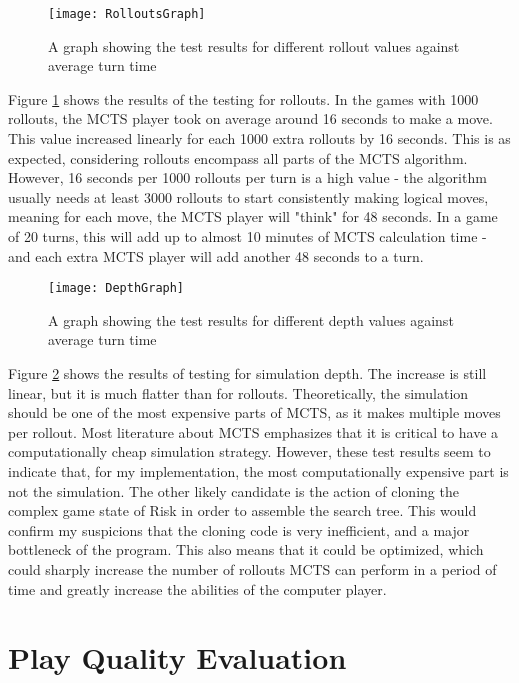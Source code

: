 \begin{figure}[H]
\texttt{[image: RolloutsGraph]}
\caption{A graph showing the test results for different rollout values against average turn time}
\label{fig:RolloutsGraph}
\end{figure}

Figure \ref{fig:RolloutsGraph} shows the results of the testing for rollouts. In the games with 1000 rollouts, the MCTS player took on average around 16 seconds to make a move. This value increased linearly for each 1000 extra rollouts by 16 seconds. This is as expected, considering rollouts encompass all parts of the MCTS algorithm. However, 16 seconds per 1000 rollouts per turn is a high value - the algorithm usually needs at least 3000 rollouts to start consistently making logical moves, meaning for each move, the MCTS player will "think" for 48 seconds. In a game of 20 turns, this will add up to almost 10 minutes of MCTS calculation time - and each extra MCTS player will add another 48 seconds to a turn.

\begin{figure}[H]
\texttt{[image: DepthGraph]}
\caption{A graph showing the test results for different depth values against average turn time}
\label{fig:DepthGraph}
\end{figure}

Figure \ref{fig:DepthGraph} shows the results of testing for simulation depth. The increase is still linear, but it is much flatter than for rollouts. Theoretically, the simulation should be one of the most expensive parts of MCTS, as it makes multiple moves per rollout. Most literature about MCTS emphasizes that it is critical to have a computationally cheap simulation strategy. However, these test results seem to indicate that, for my implementation, the most computationally expensive part is not the simulation. The other likely candidate is the action of cloning the complex game state of Risk in order to assemble the search tree. This would confirm my suspicions that the cloning code is very inefficient, and a major bottleneck of the program. This also means that it could be optimized, which could sharply increase the number of rollouts MCTS can perform in a period of time and greatly increase the abilities of the computer player.

\section{Play Quality Evaluation}
\label{playQualityEvaluation}

